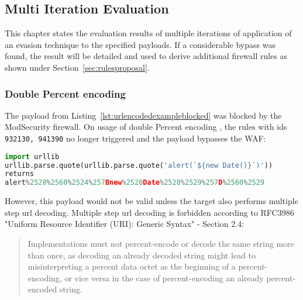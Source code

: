 \subsection{Multi Iteration Evaluation}
\label{sec:multiiteration}
This chapter states the evaluation results of multiple iterations of application of an evasion technique to the specified payloads. If a considerable bypass was found, the result will be detailed and used to derive additional firewall rules as shown under Section~\ref{sec:rulesproposal}.

\subsubsection{Double Percent encoding}
\label{sec:doublepercenc}
The payload from Listing~\ref{lst:urlencodedexampleblocked} was blocked by the ModSecurity firewall.
On usage of double Percent encoding , the rules with ids \verb|932130, 941390| no longer triggered and the payload bypasses the WAF:

\begin{lstlisting}[style=basicStyle, caption=url encoded example pass, label={lst:doublepercentencoding}, escapeinside=\^\^, language=Python]
import urllib
urllib.parse.quote(urllib.parse.quote('alert(`${new Date()}`)'))
returns
alert%2528%2560%2524%257Bnew%2520Date%2528%2529%257D%2560%2529
\end{lstlisting}

However, this payload would not be valid unless the target also performs multiple step url decoding. Multiple step url decoding is forbidden according to RFC3986 "Uniform Resource Identifier (URI): Generic Syntax" - Section 2.4:
\begin{quote}
	Implementations must not
	percent-encode or decode the same string more than once, as decoding
	an already decoded string might lead to misinterpreting a percent
	data octet as the beginning of a percent-encoding, or vice versa in
	the case of percent-encoding an already percent-encoded string.
\end{quote}

